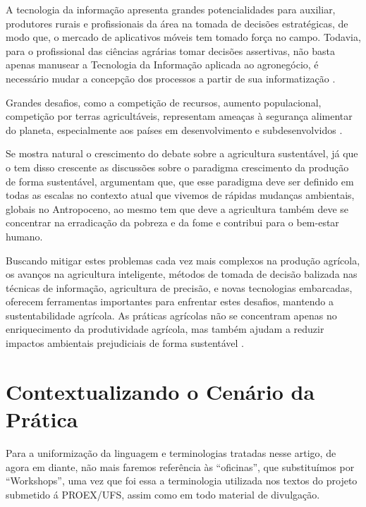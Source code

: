 A tecnologia da informação apresenta grandes potencialidades para auxiliar, produtores rurais e profissionais da área na tomada de decisões estratégicas, de modo que, o mercado de aplicativos móveis tem tomado força no campo. Todavia, para o profissional das ciências agrárias tomar decisões assertivas, não basta apenas manusear a Tecnologia da Informação aplicada ao agronegócio, é necessário mudar a concepção dos processos a partir de sua informatização \cite{ferraz_tecnologia_2017,sharma_systematic_2020}.

Grandes desafios, como a competição de recursos, aumento populacional, competição por terras agricultáveis, representam ameaças à segurança alimentar do planeta, especialmente aos países em desenvolvimento e subdesenvolvidos \cite{pardey_bounds_2014}.

Se mostra natural o crescimento do debate sobre a agricultura sustentável, já que o tem disso crescente as discussões sobre o paradigma crescimento da produção de forma sustentável,
 argumentam que, que esse paradigma deve ser definido em todas as escalas no contexto atual que vivemos de rápidas mudanças ambientais, globais no Antropoceno, ao mesmo tem que deve a agricultura também deve se concentrar na erradicação da pobreza e da fome e contribui para o bem-estar humano.

Buscando mitigar estes problemas cada vez mais complexos na produção agrícola, os avanços na agricultura inteligente, métodos de tomada de decisão balizada nas técnicas de informação, agricultura de precisão, e novas tecnologias embarcadas, oferecem ferramentas importantes para enfrentar estes desafios, mantendo a sustentabilidade agrícola. As práticas agrícolas não se concentram apenas no enriquecimento da produtividade agrícola, mas também ajudam a reduzir impactos ambientais prejudiciais de forma sustentável \cite{adnan_effects_2018,rockstrom_sustainable_2017,ye_bio-organic_2020}.


\section{Contextualizando o Cenário da Prática}

Para a uniformização da linguagem e terminologias tratadas nesse artigo, de agora em diante, não mais faremos referência às “oficinas”, que substituímos por “Workshops”, uma vez que foi essa a terminologia utilizada nos textos do projeto submetido á PROEX/UFS, assim como em todo material de divulgação.


